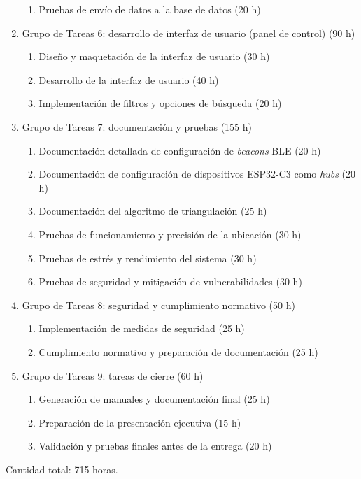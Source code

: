 \documentclass[
11pt, %
]{charter}
\begin{document}
\begin{enumerate}
\begin{enumerate}
	\item Pruebas de envío de datos a la base de datos (20 h)
	\end{enumerate}
\item Grupo de Tareas 6: desarrollo de interfaz de usuario (panel de control) (90 h)
	\begin{enumerate}
	\item Diseño y maquetación de la interfaz de usuario (30 h)
	\item Desarrollo de la interfaz de usuario (40 h)
	\item Implementación de filtros y opciones de búsqueda (20 h)
	\end{enumerate}
\item Grupo de Tareas 7: documentación y pruebas (155 h)
	\begin{enumerate}
	\item Documentación detallada de configuración de \textit{beacons} BLE (20 h)
	\item Documentación de configuración de dispositivos ESP32-C3 como \textit{hubs} (20 h)
	\item Documentación del algoritmo de triangulación (25 h)
	\item Pruebas de funcionamiento y precisión de la ubicación (30 h)
	\item Pruebas de estrés y rendimiento del sistema (30 h)
	\item Pruebas de seguridad y mitigación de vulnerabilidades (30 h)
	\end{enumerate}
\item Grupo de Tareas 8: seguridad y cumplimiento normativo (50 h)
	\begin{enumerate}
	\item Implementación de medidas de seguridad (25 h)
	\item Cumplimiento normativo y preparación de documentación (25 h)
	\end{enumerate}
\item Grupo de Tareas 9: tareas de cierre (60 h)
	\begin{enumerate}
	\item Generación de manuales y documentación final (25 h)
	\item Preparación de la presentación ejecutiva (15 h)
	\item Validación y pruebas finales antes de la entrega (20 h)
	\end{enumerate}
\end{enumerate}

Cantidad total: 715 horas.
\end{document}
